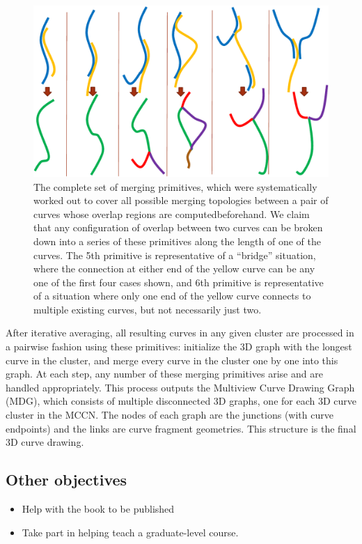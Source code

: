 \documentclass[a4paper,titlepage]{article}
\begin{document}


\begin{figure}[h]
	\begin{center}
		\centering
		\includegraphics[width=0.4\linewidth]{figs/topology.pdf}
	\end{center}
	\caption{\small The complete set of merging primitives, which were
  systematically worked out to cover all possible merging topologies between a
pair of curves whose overlap regions are computedbeforehand. We claim that any
configuration of overlap between two curves can be broken down into a series of
these primitives along the length of one of the curves. The 5th primitive is
representative of a ``bridge'' situation, where the connection at either end of
the yellow curve can be any one of the first four cases shown, and 6th primitive
is representative of a situation where only one end of the yellow curve connects
to multiple existing curves, but not necessarily just two.}
	\label{fig:junction:topology}
\end{figure}

After iterative averaging, all resulting curves in any given cluster
are processed in a pairwise fashion using these primitives: initialize the 3D
graph with the longest curve in the cluster, and merge every curve in
the cluster one by one into this graph. At each step, any number of these
merging primitives arise and are handled appropriately. This process outputs the
Multiview Curve Drawing Graph (MDG), which consists of multiple disconnected 3D
graphs, one for each 3D curve cluster in the MCCN. The nodes of each graph are
the junctions (with curve endpoints) and the links are curve fragment
geometries. This structure is the final 3D curve drawing.


\subsection{Other objectives}
\begin{itemize}
\item Help with the book to be published
\item Take part in helping teach a graduate-level course.
\end{itemize}
\end{document}
